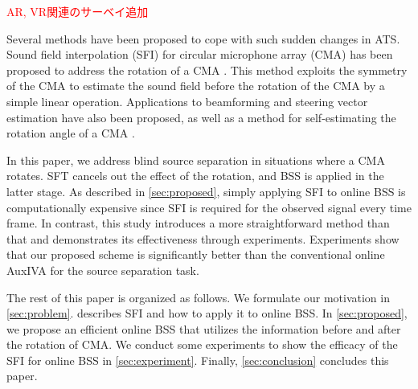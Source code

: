 \documentclass[sip,biber]{now-journal}
\newcommand{\todo}[1]{\textcolor{red}{#1}}
\begin{document}
\todo{AR, VR関連のサーベイ追加}

Several methods have been proposed to cope with such sudden changes in ATS.
Sound field interpolation (SFI) for circular microphone array (CMA) has been proposed to address the rotation of a CMA \cite{Wakabayashi:2023:ASLP}.
This method exploits the symmetry of the CMA to estimate the sound field before the rotation of the CMA by a simple linear operation.
Applications to beamforming \cite{Wakabayashi:2021:ICASSP} and steering vector estimation \cite{Wakabayashi:2021:ASJ:A} have also been proposed,
as well as a method for self-estimating the rotation angle of a CMA \cite{Lian:2021:APSIPA}.

In this paper, we address blind source separation in situations where a CMA rotates.
SFT cancels out the effect of the rotation, and BSS is applied in the latter stage.
As described in \cref{sec:proposed}, simply applying SFI to online BSS is computationally expensive since SFI is required for the observed signal every time frame.
In contrast, this study introduces a more straightforward method than that and demonstrates its effectiveness through experiments.
Experiments show that our proposed scheme is significantly better than the conventional online AuxIVA for the source separation task.

The rest of this paper is organized as follows.
We formulate our motivation in \cref{sec:problem}.
 describes SFI and how to apply it to online BSS.
In \cref{sec:proposed}, we propose an efficient online BSS that utilizes the information before and after the rotation of CMA.
We conduct some experiments to show the efficacy of the SFI for online BSS in \cref{sec:experiment}.
Finally, \cref{sec:conclusion} concludes this paper.
\end{document}
